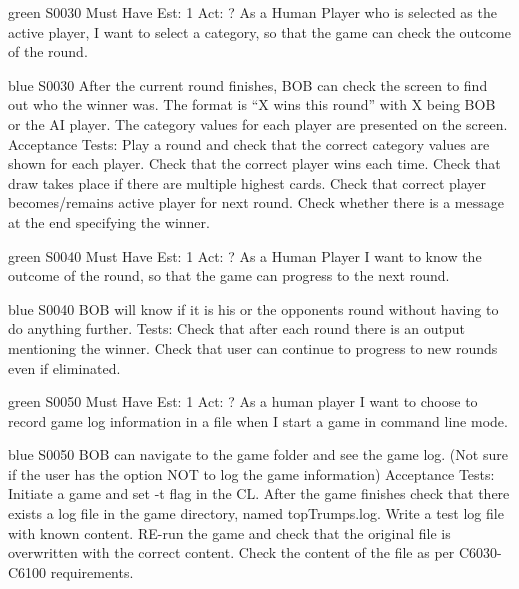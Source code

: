 
\newpage

\begin{card}{green}
{S0030}
{Must Have}
{Est: 1}
{Act: ?}
As a Human Player who is selected as the active player, I want to select a category, so that the game can check the outcome of the round.
\end{card}

\begin{card}{blue}
{S0030}{}{}{}
After the current round finishes, BOB can check the screen to find out who the winner was. 
The format is ``X wins this round'' with X being BOB or the AI player. 
The category values for each player are presented on the screen. 
Acceptance Tests: Play a round and check that the correct category values are shown for each player. 
Check that the correct player wins each time. Check that draw takes place if there are multiple highest cards. 
Check that correct player becomes/remains active player for next round. 
Check whether there is a message at the end specifying the winner.
\end{card}


\newpage

\begin{card}{green}
{S0040}
{Must Have}
{Est: 1}
{Act: ?}
As a Human Player I want to know the outcome of the round, so that the game can progress to the next round.
\end{card}

\begin{card}{blue}
{S0040}{}{}{}
BOB will know if it is his or the opponents round without having to do anything further.
Tests: Check that after each round there is an output mentioning the winner. 
Check that user can continue to progress to new rounds even if eliminated.
\end{card}


\newpage

\begin{card}{green}
{S0050}
{Must Have}
{Est: 1}
{Act: ?}
As a human player I want to choose to record game log information in a file when I start a game in command line mode.
\end{card}

\begin{card}{blue}
{S0050}{}{}{}
BOB can navigate to the game folder and see the game log. 
(Not sure if the user has the option NOT to log the game information) 
Acceptance Tests: Initiate a game and set -t flag in the CL. 
After the game finishes check that there exists a log file in the game directory, named topTrumps.log. 
Write a test log file with known content. 
RE-run the game and check that the original file is overwritten with the correct content. 
Check the content of the file as per C6030- C6100 requirements.
\end{card}

